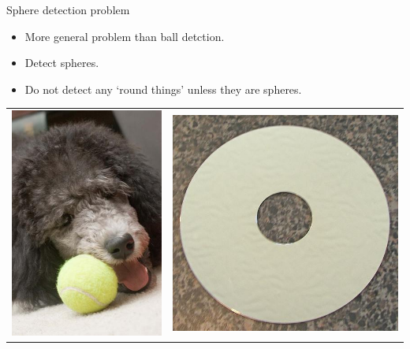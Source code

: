 \documentclass{beamer}
\newcommand{\scarequotes}[1]{`#1'}
\begin{document}
	\begin{frame}{Sphere detection problem}
		\begin{itemize}
			\item More general problem than ball detction.
			\item Detect spheres.
			\item Do not detect any \scarequotes{round things} unless they are spheres.
		\end{itemize}
		\begin{table}[H]
			\centering
			\begin{tabularx}{\textwidth}{@{}cc@{}}
				\includegraphics[height=\samplesheight]{training_images/positive/n04409515_2793} &
				\includegraphics[height=\samplesheight]{training_images/hard_negative/n03208556_9694}
			\end{tabularx}
		\end{table}
	\end{frame}
\end{document}
